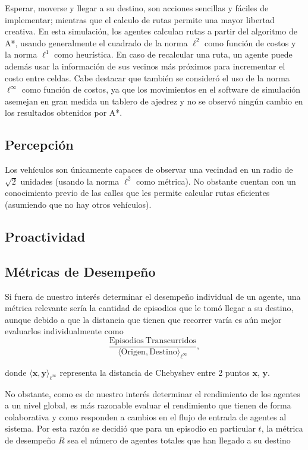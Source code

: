 \documentclass[twoside,11pt]{article}
\begin{document}
Esperar, moverse y llegar a su destino, son acciones sencillas y fáciles
de implementar; mientras que el calculo de rutas permite una mayor libertad
creativa. En esta simulación, los agentes calculan rutas a partir del algoritmo 
de A*, usando generalmente el cuadrado de la norma $\ell^{2}$ como función de costos y 
la norma $\ell^{1}$ como heurística. En caso de recalcular una ruta, un agente puede
además usar la información de sus vecinos más próximos para incrementar el costo
entre celdas. Cabe destacar que también se consideró el uso de la norma $\ell^{\infty}$
como función de costos, ya que los movimientos en el software de simulación asemejan
en gran medida un tablero de ajedrez y no se observó ningún cambio en los resultados
obtenidos por A*.

\subsection{Percepción}
Los vehículos son únicamente capaces de observar una vecindad en un radio de $\sqrt{2}$
unidades (usando la norma $\ell^{2}$ como métrica). No obstante cuentan con un conocimiento
previo de las calles que les permite calcular rutas eficientes (asumiendo que no hay otros
vehículos).

\subsection{Proactividad}

\subsection{Métricas de Desempeño}
Si fuera de nuestro interés determinar el desempeño individual de un agente, una métrica relevante sería 
la cantidad de episodios que le tomó llegar a su destino, aunque debido a que la distancia que tienen que 
recorrer varía es aún mejor evaluarlos individualmente como
\begin{equation}
  \frac{\mathrm{Episodios \ Transcurridos}}{\langle\mathrm{Origen}, \mathrm{Destino}\rangle_{\ell^{\infty}}},
\end{equation}

donde $\langle \bm{x}, \bm{y}\rangle_{\ell^{\infty}}$ representa la distancia de Chebyshev entre 2
puntos $\bm{x}$, $\bm{y}$.

No obstante, como es de nuestro interés determinar el rendimiento de los agentes a un nivel global, es más
razonable evaluar el rendimiento que tienen de forma colaborativa y como responden a cambios en el flujo de
entrada de agentes al sistema. Por esta razón se decidió que para un episodio en particular $t$, la métrica de desempeño $R$
sea el número de agentes totales que han llegado a su destino
\end{document}
